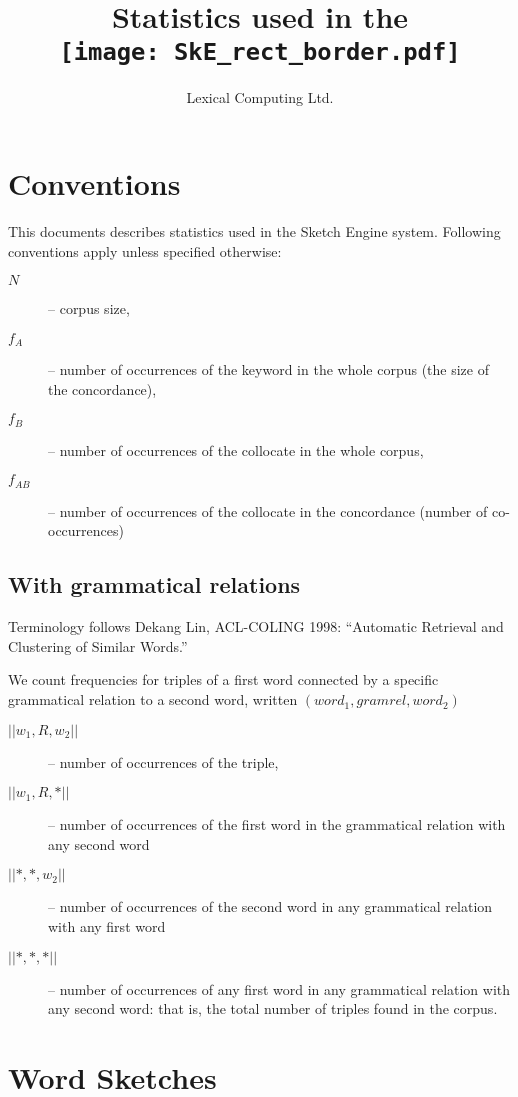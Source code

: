 \documentclass{article}
\title{Statistics used in the\\\texttt{[image: SkE\_rect\_border.pdf]}}
\author{Lexical Computing Ltd.}
\begin{document}
\maketitle
\section {Conventions}
This documents describes statistics used in the Sketch Engine system. Following conventions apply unless specified otherwise:

\begin{description}
\item[$N$]-- corpus size, 
\item[$f_A$]-- number of occurrences of the keyword in the whole corpus
(the size of the concordance), 
\item[$f_B$]-- number of occurrences of the collocate in the whole corpus,
\item[$f_{AB}$]-- number of occurrences of the collocate in the concordance
(number of co-occurrences)
\end{description}

\subsection{With grammatical relations}

Terminology follows Dekang Lin, ACL-COLING 1998: ``Automatic Retrieval and Clustering of Similar Words.''

We count frequencies for triples  of a first word  connected by a specific grammatical relation to a second word, written $(word_1, gramrel, word_2)$
\begin{description}
\item[$||w_1,R,w_2||$]-- number of occurrences of the triple, 
\item[$||w_1,R,*||$]--  number of occurrences of the first word in the grammatical relation with any second word
\item[$||*, *, w_2||$]--  number of occurrences of the second word in any grammatical relation with any first word
\item[$||*, *, *||$]--  number of occurrences of any first word in any grammatical relation with any second word: that is, the total number of triples found in the corpus.
\end{description}

\newpage
\section{Word Sketches}
\end{document}
